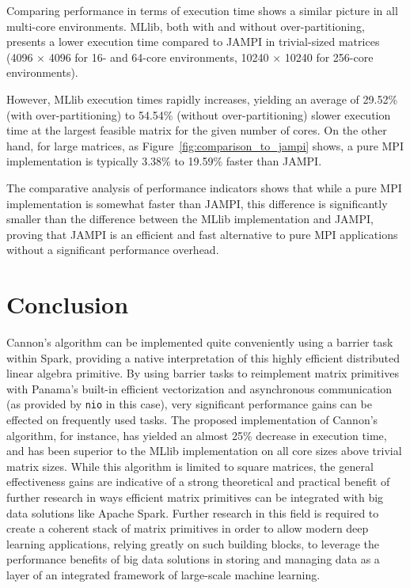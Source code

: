 \documentclass[fleqn,10pt]{SelfArx} %
\begin{document}

Comparing performance in terms of execution time shows a similar picture in all multi-core environments. MLlib, both with and without over-partitioning, presents a lower execution time compared to JAMPI in trivial-sized matrices (4096 $\times$ 4096 for 16- and 64-core environments, 10240 $\times$ 10240 for 256-core environments). 

However, MLlib execution times rapidly increases, yielding an average of 29.52\% (with over-partitioning) to 54.54\% (without over-partitioning) slower execution time at the largest feasible matrix for the given number of cores. On the other hand, for large matrices, as Figure~\ref{fig:comparison_to_jampi} shows, a pure MPI implementation is typically 3.38\% to 19.59\% faster than JAMPI. 

The comparative analysis of performance indicators shows that while a pure MPI implementation is somewhat faster than JAMPI, this difference is significantly smaller than the difference between the MLlib implementation and JAMPI, proving that JAMPI is an efficient and fast alternative to pure MPI applications without a significant performance overhead.





\section{Conclusion} %
\label{sec:conclusion}

Cannon's algorithm can be implemented quite conveniently using a barrier task within Spark, providing a native interpretation of this highly efficient distributed linear algebra primitive. By using barrier tasks to reimplement matrix primitives with Panama's built-in efficient vectorization and asynchronous communication (as provided by \texttt{nio} in this case), very significant performance gains can be effected on frequently used tasks. The proposed implementation of Cannon's algorithm, for instance, has yielded an almost 25\% decrease in execution time, and has been superior to the MLlib implementation on all core sizes above trivial matrix sizes. While this algorithm is limited to square matrices, the general effectiveness gains are indicative of a strong theoretical and practical benefit of further research in ways efficient matrix primitives can be integrated with big data solutions like Apache Spark. Further research in this field is required to create a coherent stack of matrix primitives in order to allow modern deep learning applications, relying greatly on such building blocks, to leverage the performance benefits of big data solutions in storing and managing data as a layer of an integrated framework of large-scale machine learning.
\end{document}
